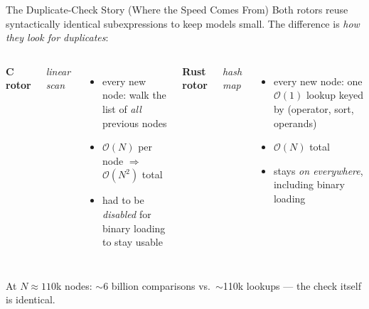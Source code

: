 \documentclass[aspectratio=169]{beamer}
\newcommand{\deflab}[2]{%
  \textbf{#1}\par\vspace{0.05cm}%
  {\color{blue!55!black}\itshape #2}\par\vspace{0.05cm}}
\begin{document}
\begin{frame}{The Duplicate-Check Story (Where the Speed Comes From)}
  Both rotors reuse syntactically identical subexpressions to keep
  models small. The difference is \emph{how they look for duplicates}:
  \vspace{0.2cm}
  \begin{columns}[T]
      \deflab{C rotor}{linear scan}
      \begin{itemize}\setlength\itemsep{0.25em}
        \item every new node: walk the list of \emph{all} previous nodes
        \item $\mathcal{O}(N)$ per node $\Rightarrow$
              $\mathcal{O}(N^2)$ total
        \item had to be \emph{disabled} for binary loading to stay usable
      \end{itemize}
      \deflab{Rust rotor}{hash map}
      \begin{itemize}\setlength\itemsep{0.25em}
        \item every new node: one $\mathcal{O}(1)$ lookup keyed by
              (operator, sort, operands)
        \item $\mathcal{O}(N)$ total
        \item stays \emph{on everywhere}, including binary loading
      \end{itemize}
  \end{columns}
  \vspace{0.15cm}
  {\footnotesize At $N \approx 110$k nodes: $\sim$6 billion comparisons
  vs.\ $\sim$110k lookups --- the check itself is identical.}
\end{frame}
\end{document}
